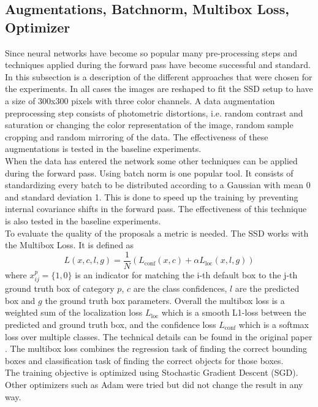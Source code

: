 \subsection{Augmentations, Batchnorm, Multibox Loss, Optimizer} 

Since neural networks have become so popular many pre-processing steps and techniques applied during the forward pass have become successful and standard. In this subsection is a description of the different approaches that were chosen for the experiments. In all cases the images are reshaped to fit the SSD setup to have a size of 300x300 pixels with three color channels. A data augmentation preprocessing step consists of photometric distortions, i.e. random contrast and saturation or changing the color representation of the image, random sample cropping and random mirroring of the data. The effectiveness of these augmentations is tested in the baseline experiments. \\
When the data has entered the network some other techniques can be applied during the forward pass. Using batch norm \cite{BatchNorm} is one popular tool. It consists of standardizing every batch to be distributed according to a Gaussian with mean 0 and standard deviation 1. This is done to speed up the training by preventing internal covariance shifts in the forward pass. The effectiveness of this technique is also tested in the baseline experiments. \\
To evaluate the quality of the proposals a metric is needed. The SSD works with the Multibox Loss. It is defined as 
\begin{equation}
	\label{eq:multibox_loss}
	L(x,c,l,g) = \frac{1}{N}(L_{\text{conf}} (x,c) + \alpha L_{\text{loc}} (x,l,g))
\end{equation}
where $x^p_{ij}=\{1,0\}$ is an indicator for matching the i-th default box to the j-th ground truth box of category $p$, $c$ are the class confidences, $l$ are the predicted box and $g$ the ground truth box parameters. Overall the multibox loss is a weighted sum of the localization loss $L_{\text{loc}}$ which is a smooth L1-loss between the predicted and ground truth box, and the confidence loss $L_{\text{conf}}$ which is a softmax loss over multiple classes. The technical details can be found in the original paper \cite{SSD}. The multibox loss combines the regression task of finding the correct bounding boxes and classification task of finding the correct objects for those boxes. \\
The training objective is optimized using Stochastic Gradient Descent (SGD). Other optimizers such as Adam were tried but did not change the result in any way. 

